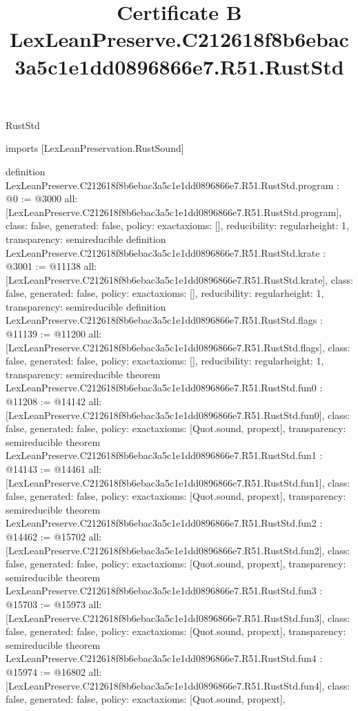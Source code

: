 \begin{lexlean}{RustStd}
\title{Certificate B LexLeanPreserve.C212618f8b6ebac3a5c1e1dd0896866e7.R51.RustStd}
\begin{coremodule}
imports [LexLeanPreservation.RustSound]

definition LexLeanPreserve.C212618f8b6ebac3a5c1e1dd0896866e7.R51.RustStd.program : @0 := @3000 {
  all: [LexLeanPreserve.C212618f8b6ebac3a5c1e1dd0896866e7.R51.RustStd.program],
  class: false,
  generated: false,
  policy: exact{axioms: []},
  reducibility: regular{height: 1},
  transparency: semireducible
}
definition LexLeanPreserve.C212618f8b6ebac3a5c1e1dd0896866e7.R51.RustStd.krate : @3001 := @11138 {
  all: [LexLeanPreserve.C212618f8b6ebac3a5c1e1dd0896866e7.R51.RustStd.krate],
  class: false,
  generated: false,
  policy: exact{axioms: []},
  reducibility: regular{height: 1},
  transparency: semireducible
}
definition LexLeanPreserve.C212618f8b6ebac3a5c1e1dd0896866e7.R51.RustStd.flags : @11139 := @11200 {
  all: [LexLeanPreserve.C212618f8b6ebac3a5c1e1dd0896866e7.R51.RustStd.flags],
  class: false,
  generated: false,
  policy: exact{axioms: []},
  reducibility: regular{height: 1},
  transparency: semireducible
}
theorem LexLeanPreserve.C212618f8b6ebac3a5c1e1dd0896866e7.R51.RustStd.fun0 : @11208 := @14142 {
  all: [LexLeanPreserve.C212618f8b6ebac3a5c1e1dd0896866e7.R51.RustStd.fun0],
  class: false,
  generated: false,
  policy: exact{axioms: [Quot.sound, propext]},
  transparency: semireducible
}
theorem LexLeanPreserve.C212618f8b6ebac3a5c1e1dd0896866e7.R51.RustStd.fun1 : @14143 := @14461 {
  all: [LexLeanPreserve.C212618f8b6ebac3a5c1e1dd0896866e7.R51.RustStd.fun1],
  class: false,
  generated: false,
  policy: exact{axioms: [Quot.sound, propext]},
  transparency: semireducible
}
theorem LexLeanPreserve.C212618f8b6ebac3a5c1e1dd0896866e7.R51.RustStd.fun2 : @14462 := @15702 {
  all: [LexLeanPreserve.C212618f8b6ebac3a5c1e1dd0896866e7.R51.RustStd.fun2],
  class: false,
  generated: false,
  policy: exact{axioms: [Quot.sound, propext]},
  transparency: semireducible
}
theorem LexLeanPreserve.C212618f8b6ebac3a5c1e1dd0896866e7.R51.RustStd.fun3 : @15703 := @15973 {
  all: [LexLeanPreserve.C212618f8b6ebac3a5c1e1dd0896866e7.R51.RustStd.fun3],
  class: false,
  generated: false,
  policy: exact{axioms: [Quot.sound, propext]},
  transparency: semireducible
}
theorem LexLeanPreserve.C212618f8b6ebac3a5c1e1dd0896866e7.R51.RustStd.fun4 : @15974 := @16802 {
  all: [LexLeanPreserve.C212618f8b6ebac3a5c1e1dd0896866e7.R51.RustStd.fun4],
  class: false,
  generated: false,
  policy: exact{axioms: [Quot.sound, propext]},
}
\end{coremodule}
\end{lexlean}
